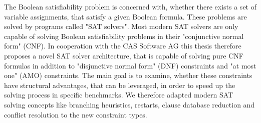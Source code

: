 
\Abstract

The Boolean satisfiability problem is concerned with, whether there exists a set of variable assignments, that satisfy a given Boolean formula. These problems are solved by programs called "SAT solvers". Most modern SAT solvers are only capable of solving Boolean satisfiability problems in their "conjunctive normal form" (CNF). In cooperation with the CAS Software AG this thesis therefore proposes a novel SAT solver architecture, that is capable of solving pure CNF formulas in addition to "disjunctive normal form" (DNF) constraints and "at most one" (AMO) constraints. The main goal is to examine, whether these constraints have structural advantages, that can be leveraged, in order to speed up the solving process in specific benchmarks. We therefore adapted modern SAT solving concepts like branching heuristics, restarts, clause database reduction and conflict resolution to the new constraint types.
